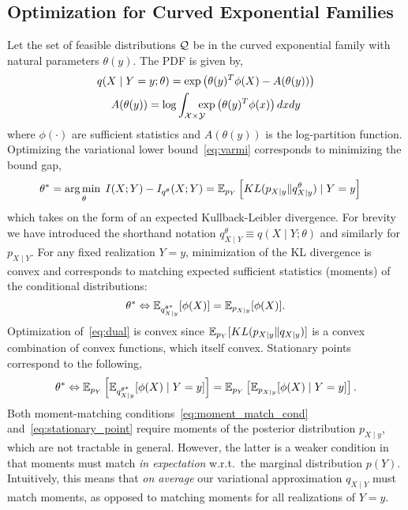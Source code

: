 \documentclass{article}
\begin{document}
\subsection{Optimization for Curved Exponential Families}
Let the set of feasible distributions $\mathcal{Q}$ be in the curved
exponential family with natural parameters $\theta(y)$.  The PDF is
given by,
\begin{gather}
  q(X \mid Y = y; \theta) = \exp\left( \theta(y)^T \phi(X) -
    A(\theta(y)) \right) \\
  A(\theta(y)) = \log \int_{\mathcal{X} \times \mathcal{Y}} \!\!\!\!\!\exp\left( \theta(y)^T \phi(x) \right)
dx dy
\end{gather}
where $\phi(\cdot)$ are sufficient statistics and $A(\theta(y))$ is
the log-partition function.  Optimizing the variational lower
bound~\eqref{eq:varmi} corresponds to minimizing the bound gap,
\begin{align}\label{eq:dual}
  \theta^* &= \operatorname*{arg\,min\;}_\theta I(X;Y) - I_{q^{\theta}}(X;Y) = \operatorname{\mathbb{E}}_{p_Y}\left[ KL(
  p_{X\mid y} \| q^\theta_{X\mid y} ) \mid Y=y \right]
\end{align}
which takes on the form of an expected Kullback-Leibler divergence.
For brevity we have introduced the shorthand notation
$q^{\theta}_{X\mid Y} \equiv q(X\mid Y; \theta)$ and similarly for
$p_{X\mid Y}$.  For any fixed realization $Y=y$, minimization of the KL
divergence is convex and corresponds to matching expected
sufficient statistics (moments) of the conditional distributions:
\begin{equation}\label{eq:moment_match_cond}
  \theta^{*} \Leftrightarrow \operatorname{\mathbb{E}}_{q^{\theta^{*}}_{X\mid y}}[ \phi(X) ]
  = \operatorname{\mathbb{E}}_{p_{X\mid y}}[\phi(X)].
\end{equation}
Optimization of~\eqref{eq:dual} is convex since $\operatorname{\mathbb{E}}_{p_Y}[ KL(
  p_{X\mid y} \| q_{X\mid y} ) ]$ is a
convex combination of convex functions, which itself convex.
Stationary points correspond to the following,
\begin{equation}\label{eq:stationary_point}
  \theta^{*} \Leftrightarrow  \operatorname{\mathbb{E}}_{p_Y}\left[ \operatorname{\mathbb{E}}_{q^{\theta^{*}}_{X\mid
        y}}[ \phi(X) \mid Y=y ] \right] = \operatorname{\mathbb{E}}_{p_Y}\left[ \operatorname{\mathbb{E}}_{p_{X\mid y}}[\phi(X) \mid Y=y ] \right] .
\end{equation}
Both moment-matching conditions~\eqref{eq:moment_match_cond}
and~\eqref{eq:stationary_point} require moments of the posterior
distribution $p_{X\mid y}$, which are not tractable in general.
However, the latter is a weaker condition in that moments must match
\emph{in expectation} w.r.t.~the marginal distribution $p(Y)$.
Intuitively, this means that \emph{on average} our variational
approximation $q_{X\mid Y}$ must match moments, as opposed to matching
moments for all realizations of $Y=y$.
\end{document}
